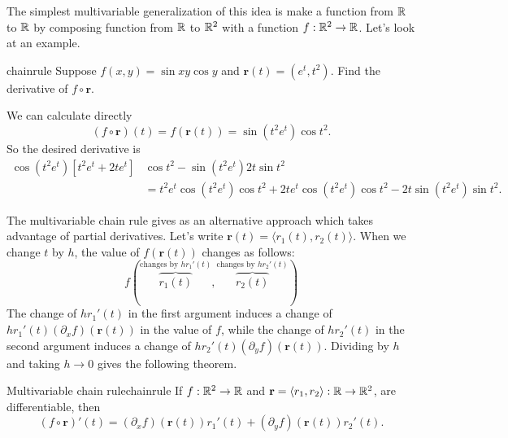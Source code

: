 \documentclass[svgnames]{watsonbook}
\begin{document}
  The simplest multivariable generalization of this idea is make a
  function from $\mathbb{R}$ to $\mathbb{R}$ by composing function from $\mathbb{R}$ to $\mathbb{R}^2$
  with a function $f: \mathbb{R}^2 \to \mathbb{R}$. Let's look at an example.

  \begin{example}{}{chainrule}
    Suppose $f(x,y) = \sin xy \cos y$ and $\mathbf{r}(t) = (e^t,
    t^2)$. Find the derivative of $f \circ \mathbf{r}$. 
  \end{example}

  \begin{solution}
    We can calculate directly
    \[
      (f \circ \mathbf{r})(t) = f(\mathbf{r}(t)) = \sin (t^2e^t) \cos
      t^2. 
    \]
    So the desired derivative is
    \begin{align*}
      \cos(t^2e^t)\left[ t^2 e^t + 2te^t\right] &\cos t^2  -
      \sin(t^2 e^t) 2t \sin t^2  \\ &=
      t^2 e^t \cos(t^2 e^t) \cos t^2 + 2te^t \cos(t^2 e^t) \cos t^2 -
      2t\sin(t^2 e^t) \sin t^2. 
    \end{align*}
  \end{solution}

  The multivariable chain rule gives as an alternative approach which
  takes advantage of partial derivatives. Let's write
  $\mathbf{r}(t) = \langle r_1(t), r_2(t) \rangle$.  When we change
  $t$ by $h$, the value of $f(\mathbf{r}(t))$ changes as follows: 
  \[
    f\left(
      \overbrace{r_1(t)}^{\text{changes by $hr_1'(t)$}},
      \overbrace{r_2(t)}^{\text{changes by $hr_2'(t)$}}
    \right)
  \]
  The change of $hr_1'(t)$ in the first argument induces a change of
  $hr_1'(t) (\partial_xf)(\mathbf{r}(t))$ in the value of $f$, while
  the change of $hr_2'(t)$ in the second argument induces a change of
  $hr_2'(t) (\partial_yf)(\mathbf{r}(t))$. Dividing by $h$ and taking
  $h \to 0$ gives the following theorem. 
  
  \begin{theo}{Multivariable chain rule}{chainrule}
    If $f : \mathbb{R}^2 \to \mathbb{R}$ and $\mathbf{r} = \langle r_1,  r_2\rangle :
    \mathbb{R} \to \mathbb{R}^2$,
    are differentiable, then
    \begin{equation} \label{eq:chainrule} 
      (f\circ \mathbf{r})'(t) = (\partial_x f)(\mathbf{r}(t))r_1'(t) +
      (\partial_y f)(\mathbf{r}(t))r_2'(t). 
    \end{equation}
  \end{theo}
\end{document}
